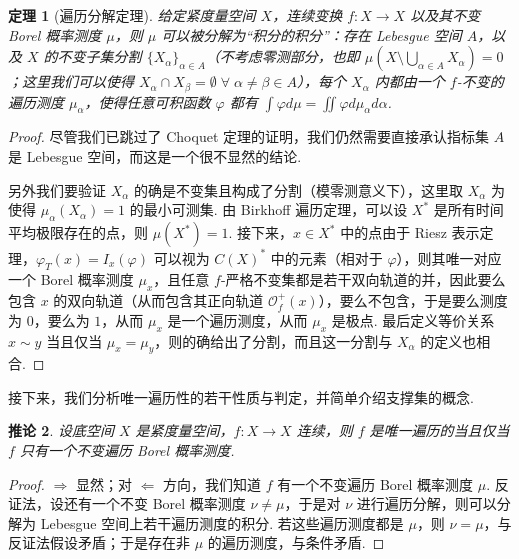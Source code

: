 \documentclass[11pt, a4paper, oneside]{ctexart}
\newtheorem{theorem}{定理}[section]
\newtheorem{corollary}[theorem]{推论}
\newcommand{\cO}{\mathcal{O}}
\begin{document}
    \begin{theorem}[遍历分解定理]\label{定理2.18}
        给定紧度量空间 $X$，连续变换 $f:X\to X$ 以及其不变 Borel 概率测度 $\mu$，则 $\mu$ 可以被分解为“积分的积分”：存在 Lebesgue 空间 $A$，以及 $X$ 的不变子集分割 ${\{X_{\alpha}\}}_{\alpha\in A}$（不考虑零测部分，也即 $\mu(X\setminus\bigcup\limits_{\alpha\in A}X_{\alpha})=0$；这里我们可以使得 $X_{\alpha}\cap X_{\beta}=\emptyset \; \forall\; \alpha\neq \beta\in A$），每个 $X_{\alpha}$ 内都由一个 $f$-不变的遍历测度 $\mu_{\alpha}$，使得任意可积函数 $\varphi$ 都有 $\int\varphi d\mu=\iint \varphi d\mu_{\alpha}d\alpha$.
    \end{theorem}
    \begin{proof}
        尽管我们已跳过了 Choquet 定理的证明，我们仍然需要直接承认指标集 $A$ 是 Lebesgue 空间，而这是一个很不显然的结论.

        另外我们要验证 $X_{\alpha}$ 的确是不变集且构成了分割（模零测意义下），这里取 $X_{\alpha}$ 为使得 $\mu_{\alpha}(X_{\alpha})=1$ 的最小可测集. 由 Birkhoff 遍历定理，可以设 $X^*$ 是所有时间平均极限存在的点，则 $\mu(X^*)=1$. 接下来，$x\in X^*$ 中的点由于 Riesz 表示定理，$\varphi_T(x)=I_x(\varphi)$ 可以视为 ${C(X)}^*$ 中的元素（相对于 $\varphi$），则其唯一对应一个 Borel 概率测度 $\mu_x$，且任意 $f$-严格不变集都是若干双向轨道的并，因此要么包含 $x$ 的双向轨道（从而包含其正向轨道 $\cO_f^+(x)$），要么不包含，于是要么测度为 $0$，要么为 $1$，从而 $\mu_x$ 是一个遍历测度，从而 $\mu_x$ 是极点. 最后定义等价关系 $x\sim y$ 当且仅当 $\mu_x=\mu_y$，则的确给出了分割，而且这一分割与 $X_{\alpha}$ 的定义也相合.
    \end{proof}

    接下来，我们分析唯一遍历性的若干性质与判定，并简单介绍支撑集的概念.

    \begin{corollary}\label{推论2.19}
        设底空间 $X$ 是紧度量空间，$f:X\to X$ 连续，则 $f$ 是唯一遍历的当且仅当 $f$ 只有一个不变遍历 Borel 概率测度.
    \end{corollary}
    \begin{proof}
        $\Rightarrow$ 显然；对 $\Leftarrow$ 方向，我们知道 $f$ 有一个不变遍历 Borel 概率测度 $\mu$. 反证法，设还有一个不变 Borel 概率测度 $\nu\neq \mu$，于是对 $\nu$ 进行遍历分解，则可以分解为 Lebesgue 空间上若干遍历测度的积分. 若这些遍历测度都是 $\mu$，则 $\nu=\mu$，与反证法假设矛盾；于是存在非 $\mu$ 的遍历测度，与条件矛盾.
    \end{proof}
\end{document}
